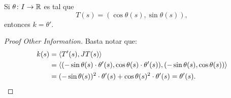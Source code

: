 
\begin{prop}
	Si $\theta \colon I \to \mathbb{R}$ es tal que
	\[ T(s) = (\cos \theta(s), \sin \theta(s)), \]
	entonces $k = \theta'$.
\end{prop}
\begin{proof}[Proof Other Information]
	Basta notar que:
	\begin{align*}
		k(s) &= \langle T'(s), JT(s) \rangle \\
		&= \langle (-\sin \theta(s) \cdot \theta'(s), \cos \theta(s) \cdot \theta'(s)), (-\sin \theta(s), \cos \theta(s)) \rangle \\
		&= (-\sin \theta(s))^{2} \cdot \theta'(s) + \cos \theta(s)^{2} \cdot \theta'(s) = \theta'(s)
	.\qedhere\end{align*}
\end{proof}

